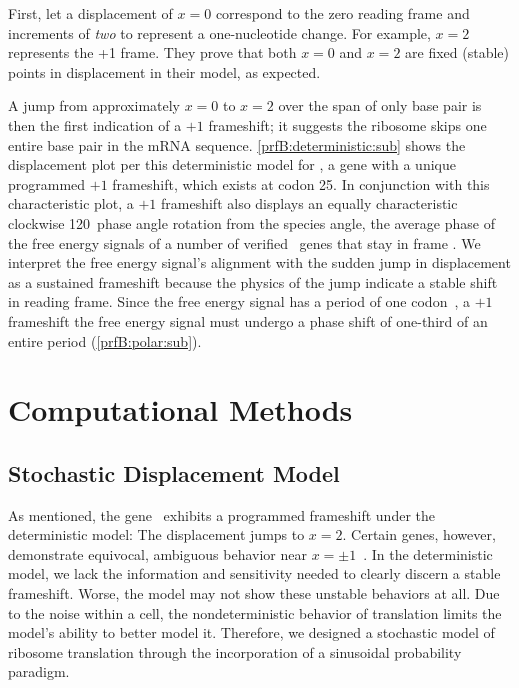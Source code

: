 \documentclass[12pt]{article}
\numberwithin{equation}{section}
\begin{document}
First, \citeauthor{lalit:mechanics} let a displacement of $x = 0$ correspond
to the zero reading frame and increments of \emph{two} to represent a
one-nucleotide change. For example, $x =2$ represents the +1 frame.
They prove that both $x = 0$ and $x = 2$ are fixed
(stable) points in displacement in their model, as expected.

A jump from approximately $x = 0$ to $x = 2$ over the span of only
base pair is then the first indication of a $+1$ frameshift; it
suggests the ribosome skips one entire base pair in the mRNA sequence.
\autoref{prfB:deterministic:sub} shows the displacement plot per this
deterministic model for \prfB, a gene with a unique programmed $+1$
frameshift, which exists at codon 25. In conjunction with this
characteristic plot, a $+1$ frameshift also displays an equally
characteristic clockwise 120\degree\ phase angle rotation from the
species angle, the average phase of the free energy signals of a
number of verified \ecoli\ genes that stay in frame
\cite{lalit:mechanics}.  We interpret the free energy signal's
alignment with the sudden jump in displacement as a sustained
frameshift because the physics of the jump indicate a stable shift in
reading frame. Since the free energy signal has a period of one
codon~\cite{lalit:mechanics}, a $+1$ frameshift the free energy signal
must undergo a phase shift of one-third of an entire period
(\autoref{prfB:polar:sub}).

\section{Computational Methods}

\subsection{Stochastic Displacement Model}
\label{stochastic}

As mentioned, the gene \prfB\ exhibits a programmed frameshift under
the deterministic model: The displacement jumps to $x=2$.  Certain
genes, however, demonstrate equivocal, ambiguous behavior near
$x = \pm 1$~\cite{lalit:mechanics}.  In the deterministic model, we lack the
information and sensitivity needed to clearly discern a stable
frameshift. Worse, the model may not show these unstable
behaviors at all. Due to the noise within a cell, the nondeterministic
behavior of translation limits the model's
ability to better model it. Therefore, we designed a
stochastic model of ribosome translation through the incorporation of
a sinusoidal probability paradigm.
\end{document}
